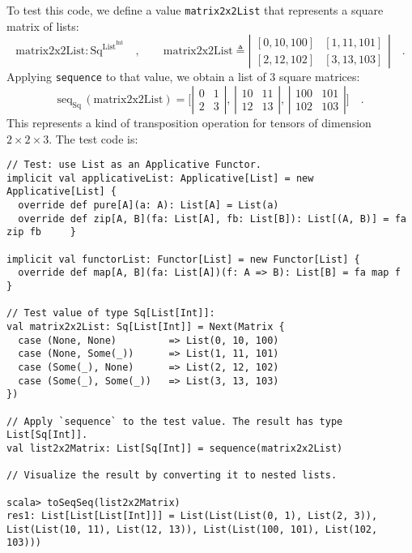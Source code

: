 To test this code, we define a value \lstinline!matrix2x2List! that
represents a square matrix of lists:
\[
\text{matrix2x2List}:\text{Sq}^{\text{List}^{\text{Int}}}\quad,\quad\quad\text{matrix2x2List}\triangleq\left|\begin{array}{cc}
\left[0,10,100\right] & \left[1,11,101\right]\\
\left[2,12,102\right] & \left[3,13,103\right]
\end{array}\right|\quad.
\]
 Applying \lstinline!sequence! to that value, we obtain a list of
$3$ square matrices:
\[
\text{seq}_{\text{Sq}}\,(\text{matrix2x2List})=\big[\left|\begin{array}{cc}
0 & 1\\
2 & 3
\end{array}\right|,\,\left|\begin{array}{cc}
10 & 11\\
12 & 13
\end{array}\right|,\,\left|\begin{array}{cc}
100 & 101\\
102 & 103
\end{array}\right|\big]\quad.
\]
This represents a kind of transposition operation for tensors of dimension
$2\times2\times3$. The test code is:
\begin{lstlisting}[frame=single,fillcolor={\color{black}},framesep={0.2mm},framexleftmargin=2mm,framexrightmargin=2mm,framextopmargin=2mm,framexbottommargin=2mm]
// Test: use List as an Applicative Functor.
implicit val applicativeList: Applicative[List] = new Applicative[List] {
  override def pure[A](a: A): List[A] = List(a)
  override def zip[A, B](fa: List[A], fb: List[B]): List[(A, B)] = fa zip fb     }

implicit val functorList: Functor[List] = new Functor[List] {
  override def map[A, B](fa: List[A])(f: A => B): List[B] = fa map f
}

// Test value of type Sq[List[Int]]:
val matrix2x2List: Sq[List[Int]] = Next(Matrix {
  case (None, None)         => List(0, 10, 100)
  case (None, Some(_))      => List(1, 11, 101)
  case (Some(_), None)      => List(2, 12, 102)
  case (Some(_), Some(_))   => List(3, 13, 103)
})

// Apply `sequence` to the test value. The result has type List[Sq[Int]].
val list2x2Matrix: List[Sq[Int]] = sequence(matrix2x2List)

// Visualize the result by converting it to nested lists.

scala> toSeqSeq(list2x2Matrix)
res1: List[List[List[Int]]] = List(List(List(0, 1), List(2, 3)), List(List(10, 11), List(12, 13)), List(List(100, 101), List(102, 103))) 
\end{lstlisting}


